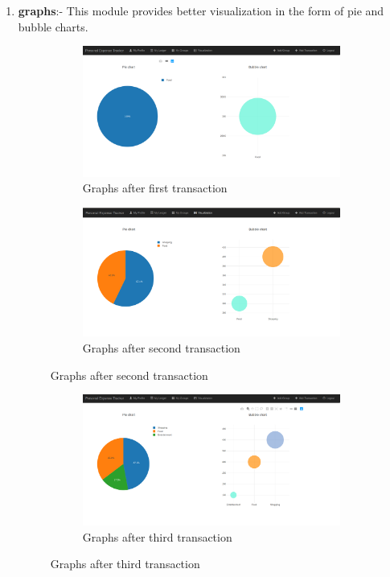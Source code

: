 \documentclass[12pt]{article}
\begin{document}
\begin{enumerate}
    \item \textbf{graphs}:- This module provides better visualization in the form of pie and bubble charts.
    \begin{figure}[tb]
        \begin{subfigure}[t]{1\hsize}
            \includegraphics[width=0.9\linewidth]{visualize1.png}
            \caption{Graphs after first transaction}
        \end{subfigure}   
        \begin{subfigure}[t]{1\hsize}
            \includegraphics[width=0.9\linewidth]{visualize2.png}
            \caption{Graphs after second transaction}
        \end{subfigure}
            \end{figure}
            \clearpage
            \begin{figure}[tb]\ContinuedFloat
        \begin{subfigure}[t]{1\hsize}
            \includegraphics[width=0.9\linewidth]{visualize3.png}
            \caption{Graphs after third transaction}
        \end{subfigure}


\end{figure}
\end{enumerate}
\end{document}
